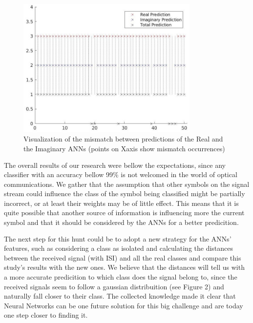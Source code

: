 \documentclass[10pt]{IEEEtran}
\begin{document}
\begin{figure}[h]
\centering
\includegraphics[width=9cm]{mismatch.jpg}
\caption{Visualization of the mismatch between predictions of the Real and the Imaginary ANNs (points on Xaxis show mismatch occurrences)}
\end{figure}

The overall results of our research were bellow the expectations, since any classifier with an accuracy bellow 99\% is not welcomed in the world of optical communications. We gather that the assumption that other symbols on the signal stream could influence the class of the symbol being classified might be partially incorrect, or at least their weights may be of little effect. This means that it is quite possible that another source of information is influencing more the current symbol and that it should be considered by the ANNs for a better predicition.

The next step for this hunt could be to adopt a new strategy for the ANNs' features, such as considering a class as isolated and calculating the distances between the received signal (with ISI) and all the real classes and compare this study's results with the new ones. We believe that the distances will tell us with a more accurate predicition to which class does the signal belong to, since the received signals seem to follow a gaussian distribuition (see Figure 2) and naturally fall closer to their class. The collected knowledge made it clear that Neural Networks can be one future solution for this big challenge and are today one step closer to finding it.
\end{document}
